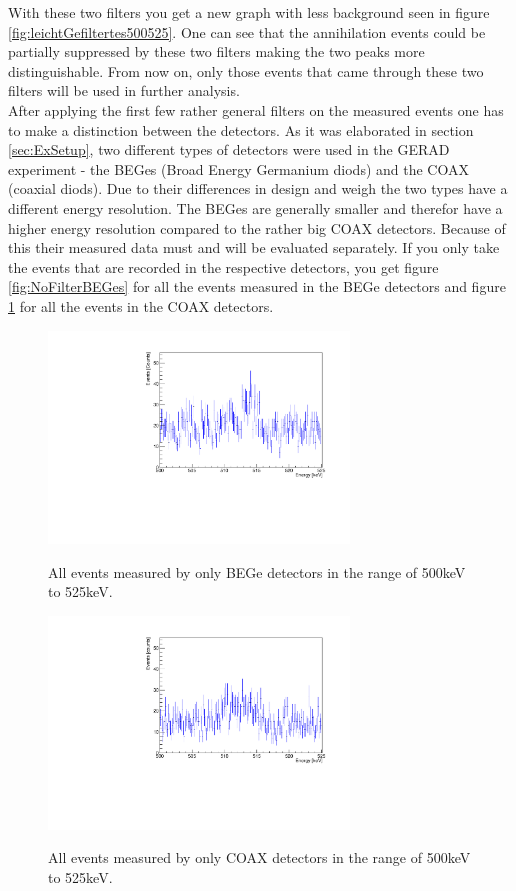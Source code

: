 With these two filters you get a new graph with less background seen in figure \ref{fig:leichtGefiltertes500525}.
One can see that the annihilation events could be partially suppressed by these two filters making the two peaks more distinguishable.
From now on, only those events that came through these two filters will be used in further analysis.
\\

After applying the first few rather general filters on the measured events one has to make a distinction between the detectors.
As it was elaborated in section \ref{sec:ExSetup}, two different types of detectors were used in the GERAD experiment - the BEGes (Broad Energy Germanium diods) and the COAX (coaxial diods). 
Due to their differences in design and weigh the two types have a different energy resolution. 
The BEGes are generally smaller and therefor have a higher energy resolution compared to the rather big COAX detectors.
Because of this their measured data must and will be evaluated separately. 
If you only take the events that are recorded in the respective detectors, you get figure \ref{fig:NoFilterBEGes} for all the events measured in the BEGe detectors and figure \ref{fig:NoFilterCOAX} for all the events in the COAX detectors.
\\

\begin{figure}[t!]
\centering
\begin{minipage}{.5\textwidth}
  \centering
	\includegraphics[width=80mm]{./Bilder/500525NoFilterBEGes.pdf}
  \caption{}{All events measured by only BEGe detectors in the range of 500keV to 525keV.}
  \label{fig:NoFilterBEGes}
\end{minipage}%
\begin{minipage}{.5\textwidth}
  \centering
	\includegraphics[width=80mm]{./Bilder/500525NoFilterCOAX.pdf}
  \caption{}{All events measured by only COAX detectors in the range of 500keV to 525keV.}
  \label{fig:NoFilterCOAX}
\end{minipage}
\end{figure}

